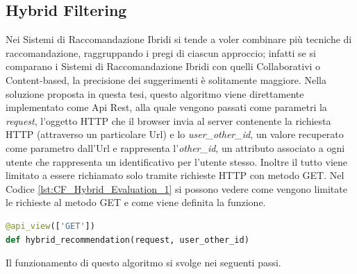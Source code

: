 \subsection{Hybrid Filtering} 
Nei Sistemi di Raccomandazione Ibridi si tende a voler combinare più tecniche di raccomandazione, raggruppando i 
pregi di ciascun approccio; infatti se si comparano i Sistemi di Raccomandazione Ibridi con quelli Collaborativi o 
Content-based, la precisione dei suggerimenti è solitamente maggiore.\hfill\break
Nella soluzione proposta in questa tesi, questo algoritmo viene direttamente implementato come Api Rest, alla quale vengono 
passati come parametri la \textit{request}, l'oggetto HTTP che il browser invia al server contenente la richiesta HTTP 
(attraverso un particolare Url) e lo \textit{user\_other\_id}, un valore recuperato come parametro dall'Url e rappresenta 
l'\textit{other\_id}, un attributo associato a ogni utente che rappresenta un identificativo per l'utente stesso. Inoltre il 
tutto viene limitato a essere richiamato solo tramite richieste HTTP con metodo GET.\hfill\break
Nel Codice \ref{lst:CF_Hybrid_Evaluation_1} si possono vedere come vengono limitate le richieste al metodo GET e come 
viene definita la funzione.
\begin{lstlisting}[language=Python, label=lst:CF_Hybrid_Evaluation_1, caption={\ }]
@api_view(['GET'])
def hybrid_recommendation(request, user_other_id)
\end{lstlisting} 
%
Il funzionamento di questo algoritmo si svolge nei seguenti passi.
